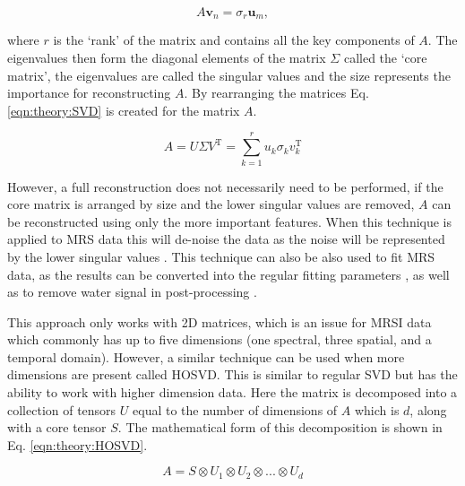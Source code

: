 \begin{equation}
    A \mathbf{v}_n = \sigma_r \mathbf{u}_m ,
\end{equation}

\noindent where $r$ is the `rank' of the matrix and contains all the key components of $A$. The eigenvalues then form the diagonal elements of the matrix $\Sigma$ called the `core matrix', the eigenvalues are called the singular values and the size represents the importance for reconstructing $A$. By rearranging the matrices Eq. \ref{eqn:theory:SVD} is created for the matrix $A$.

\begin{equation}
    A = U\Sigma V^\textrm{T} = \sum_{k=1}^{r} u_k\sigma_kv_k^\textrm{T}
    \label{eqn:theory:SVD}
\end{equation}

\noindent However, a full reconstruction does not necessarily need to be performed, if the core matrix is arranged by size and the lower singular values are removed, $A$ can be reconstructed using only the more important features. When this technique is applied to \ac{MRS} data this will de-noise the data as the noise will be represented by the lower singular values \cite{Brender2019DynamicHyperpolarization}. This technique can also be also used to fit \ac{MRS} data, as the results can be converted into the regular fitting parameters \cite{Pijnappel1992SVD-basedSignals}, as well as to remove water signal in post-processing \cite{Cabanes2001OptimizationBrain}.

This approach only works with 2D matrices, which is an issue for \ac{MRSI} data which commonly has up to five dimensions (one spectral, three spatial, and a temporal domain). However, a similar technique can be used when more dimensions are present called \ac{HOSVD}. This is similar to regular \ac{SVD} but has the ability to work with higher dimension data. Here the matrix is decomposed into a collection of tensors $U$ equal to the number of dimensions of $A$ which is $d$, along with a core tensor $S$. The mathematical form of this decomposition is shown in Eq. \ref{eqn:theory:HOSVD}.

\begin{equation}
    A = S \otimes U_1 \otimes U_2 \otimes ... \otimes U_d
    \label{eqn:theory:HOSVD}
\end{equation}

